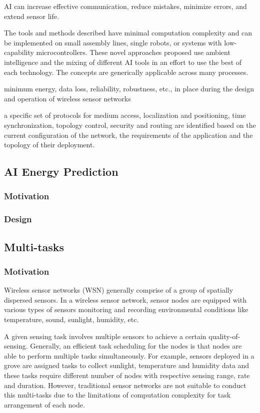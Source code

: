 AI can increase effective communication, reduce mistakes, minimize errors, and extend sensor life.



The tools and methods described have minimal computation complexity and can be implemented on small assembly lines, single robots, or systems with low-capability microcontrollers. These novel approaches proposed use ambient intelligence and the mixing of different AI tools in an effort to use the best of each technology. The concepts are generically applicable across many processes.


minimum energy, data loss, reliability, robustness, etc., in place during the design and operation of wireless sensor networks

a specific set of protocols for medium access, localization and positioning, time synchronization, topology control, security and routing are identified based on the current configuration of the network, the requirements of the application and the topology of their deployment.

\subsection{AI Energy Prediction}

\subsubsection{Motivation}

\subsubsection{Design}

\subsection{Multi-tasks}

\subsubsection{Motivation}

Wireless sensor networks (WSN)  generally comprise of a group of 
spatially dispersed sensors. In a wireless sensor network, 
sensor nodes are equipped with various 
types of sensors monitoring and recording 
environmental conditions like temperature, sound, sunlight,
humidity, etc.

A given sensing task involves multiple sensors to 
achieve a certain quality-of-sensing.
Generally, an efficient task scheduling for the nodes is that nodes 
are able to perform multiple tasks simultaneously. 
For example, sensors deployed in a grove are assigned tasks to collect
sunlight, temperature and humidity data and these tasks require different 
number of  nodes with respective sensing range, rate and duration.
However, traditional sensor networks are not suitable to conduct this 
multi-tasks due to the limitations of computation complexity for task 
arrangement of each node.

